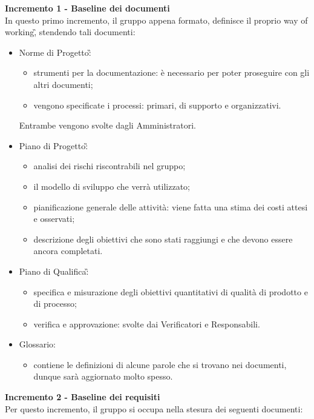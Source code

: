 {{    \textbf{Incremento 1 - Baseline dei documenti}\\  
    In questo primo incremento, il gruppo appena formato, definisce il proprio way of working\G, stendendo tali documenti:
    \begin{itemize}
        \item Norme di Progetto\G:
            \begin{itemize}
                \item strumenti per la documentazione: è necessario per poter proseguire con gli altri documenti;
                \item vengono specificate i processi: primari, di supporto e organizzativi. 
            \end{itemize}
        Entrambe vengono svolte dagli Amministratori.
        \item Piano di Progetto\G: 
            \begin{itemize}
                \item analisi dei rischi riscontrabili nel gruppo;
                \item il modello di sviluppo che verrà utilizzato;
                \item pianificazione generale delle attività: viene fatta una stima dei costi attesi e osservati;
                \item descrizione degli obiettivi che sono stati raggiungi e che devono essere ancora completati.
            \end{itemize}
        \item Piano di Qualifica\G: 
            \begin{itemize}
                \item specifica e misurazione degli obiettivi quantitativi di qualità di prodotto e di processo;
                \item verifica e approvazione: svolte dai Verificatori e Responsabili.
            \end{itemize}
        \item Glossario: 
            \begin{itemize}
                \item contiene le definizioni di alcune parole che si trovano nei documenti, dunque sarà aggiornato molto spesso.
            \end{itemize}
    \end{itemize}
    \textbf{Incremento 2 - Baseline dei requisiti} \\
    Per questo incremento, il gruppo si occupa nella stesura dei seguenti documenti:
}}
